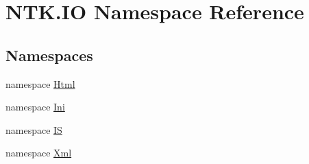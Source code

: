 \hypertarget{namespace_n_t_k_1_1_i_o}{}\section{N\+T\+K.\+IO Namespace Reference}
\label{namespace_n_t_k_1_1_i_o}
\subsection*{Namespaces}
\begin{DoxyCompactItemize}
\item 
namespace \mbox{\hyperlink{namespace_n_t_k_1_1_i_o_1_1_html}{Html}}
\item 
namespace \mbox{\hyperlink{namespace_n_t_k_1_1_i_o_1_1_ini}{Ini}}
\item 
namespace \mbox{\hyperlink{namespace_n_t_k_1_1_i_o_1_1_i_s}{IS}}
\item 
namespace \mbox{\hyperlink{namespace_n_t_k_1_1_i_o_1_1_xml}{Xml}}
\end{DoxyCompactItemize}
